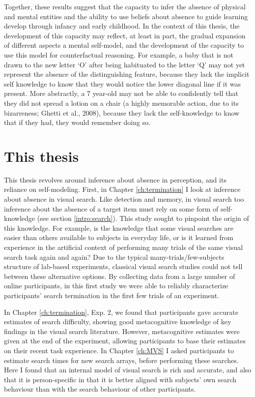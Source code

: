 \documentclass[12pt,twoside]{reedthesis}
\begin{document}
Together, these results suggest that the capacity to infer the absence of physical and mental entities and the ability to use beliefs about absence to guide learning develop through infancy and early childhood. In the context of this thesis, the development of this capacity may reflect, at least in part, the gradual expansion of different aspects a mental self-model, and the development of the capacity to use this model for counterfactual reasoning. For example, a baby that is not drawn to the new letter `O' after being habituated to the letter `Q' may not yet represent the absence of the distinguishing feature, because they lack the implicit self knowledge to know that they would notice the lower diagonal line if it was present. More abstractly, a 7 year-old may not be able to confidently tell that they did not spread a lotion on a chair (a highly memorable action, due to its bizarreness; Ghetti et al., 2008), because they lack the self-knowledge to know that if they had, they would remember doing so.

\hypertarget{this-thesis}{%
\section{This thesis}\label{this-thesis}}

This thesis revolves around inference about absence in perception, and its reliance on self-modeling. First, in Chapter \ref{ch:termination} I look at inference about absence in visual search. Like detection and memory, in visual search too inference about the absence of a target item must rely on some form of self-knowledge (see section \ref{intro:search}). This study sought to pinpoint the origin of this knowledge. For example, is the knowledge that some visual searches are easier than others available to subjects in everyday life, or is it learned from experience in the artificial context of performing many trials of the same visual search task again and again? Due to the typical many-trials/few-subjects structure of lab-based experiments, classical visual search studies could not tell between these alternative options. By collecting data from a large number of online participants, in this first study we were able to reliably characterize participants' search termination in the first few trials of an experiment.

In Chapter \ref{ch:termination}, Exp. 2, we found that participants gave accurate estimates of search difficulty, showing good metacognitive knowledge of key findings in the visual search literature. However, metacognitive estimates were given at the end of the experiment, allowing participants to base their estimates on their recent task experience. In Chapter \ref{ch:MVS} I asked participants to estimate search times for new search arrays, before performing these searches. Here I found that an internal model of visual search is rich and accurate, and also that it is person-specific in that it is better aligned with subjects' own search behaviour than with the search behaviour of other participants.
\end{document}
